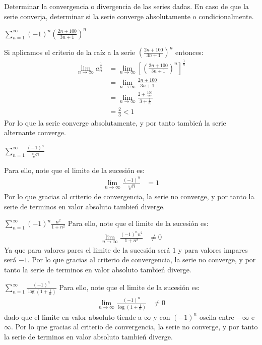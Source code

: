 \documentclass[../main.tex]{subfiles}
\begin{document}
Determinar la convergencia o divergencia de las series dadas. En caso de que la serie converja, determinar si la serie converge absolutamente o condicionalmente.

\question $\sum\limits_{n = 1}^\infty (-1)^n \left(\frac{2n+100}{3n+1}\right)^n$

Si aplicamos el criterio de la raíz a la serie $\left(\frac{2n+100}{3n+1}\right)^n$ entonces:
\begin{align*}
    \lim_{n \to \infty} a_n^{\frac{1}{n}} &= \lim_{n \to \infty} \left[\left(\frac{2n+100}{3n+1}\right)^n\right]^{\frac{1}{n}}\\
    &= \lim_{n \to \infty} \frac{2n+100}{3n+1}\\
    &= \lim_{n \to \infty} \frac{2 + \frac{100}{n}}{3 + \frac{1}{n}}\\
    &= \frac{2}{3} < 1
\end{align*}
Por lo que la serie converge absolutamente, y por tanto tambień la serie alternante converge.

\question $\sum\limits_{n = 1}^\infty \frac{(-1)^n}{\sqrt[n]{n}}$

Para ello, note que el limite de la sucesión es:
\begin{align*}
    \lim_{n \to \infty} \frac{(-1)^n}{\sqrt[n]{n}} &= 1
\end{align*}
Por lo que gracias al criterio de convergencia, la serie no converge, y por tanto la serie de terminos en valor absoluto tambień diverge.

\question $\sum\limits_{n = 1}^\infty (-1)^n \frac{n^2}{1+n^2}$
Para ello, note que el limite de la sucesión es:
\begin{align*}
    \lim_{n \to \infty} \frac{(-1)^n n^2}{1 + n^2} &\neq 0
\end{align*}
Ya que para valores pares el limite de la sucesión será $1$ y para valores impares será $-1$. Por lo que gracias al criterio de convergencia, la serie no converge, y por tanto la serie de terminos en valor absoluto tambień diverge.

\question $\sum\limits_{n = 1}^\infty \frac{(-1)^n}{\log\left(1 + \frac{1}{n}\right)}$
Para ello, note que el limite de la sucesión es:
\begin{align*}
    \lim_{n \to \infty} \frac{(-1)^n}{\log\left(1 + \frac{1}{n}\right)} &\neq 0
\end{align*}
dado que el limite en valor absoluto tiende a $\infty$ y con $(-1)^n$ oscila entre $-\infty$ e $\infty$. Por lo que gracias al criterio de convergencia, la serie no converge, y por tanto la serie de terminos en valor absoluto tambień diverge.
\end{document}

